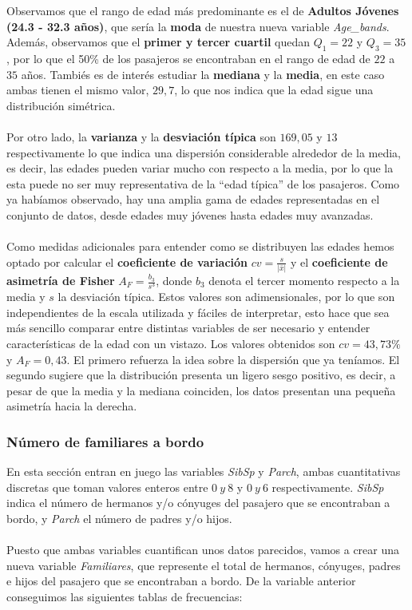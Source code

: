 \documentclass{article}
\begin{document}
\newpage
\noindent Observamos que el rango de edad más predominante es el de \textbf{Adultos Jóvenes (24.3 - 32.3 años)}, que sería la \textbf{moda} de nuestra nueva variable \textit{Age\_bands}. Además, observamos que el \textbf{primer y tercer cuartil} quedan $Q_{1}=22$ y $Q_{3}=35$, por lo que el 50\% de los pasajeros se encontraban en el rango de edad de $22$ a $35$ años. Tambiés es de interés estudiar la \textbf{mediana} y la \textbf{media}, en este caso ambas tienen el mismo valor, $29,7$, lo que nos indica que la edad sigue una distribución simétrica.\\\\
Por otro lado, la \textbf{varianza} y la \textbf{desviación típica} son $169,05$ y $13$ respectivamente lo que indica una dispersión considerable alrededor de la media, es decir, las edades pueden variar mucho con respecto a la media, por lo que la esta puede no ser muy representativa de la ``edad típica'' de los pasajeros. Como ya habíamos observado, hay una amplia gama de edades representadas en el conjunto de datos, desde edades muy jóvenes hasta edades muy avanzadas.\\\\
Como medidas adicionales para entender como se distribuyen las edades hemos optado por calcular el \textbf{coeficiente de variación} $cv=\frac{s}{|\bar{x}|}$ y 
el \textbf{coeficiente de asimetría de Fisher} $A_{F}=\frac{b_{3}}{s^{3}}$, donde $b_{3}$ denota el tercer momento respecto a la media y $s$ la desviación típica. Estos valores son adimensionales, por lo que son independientes de la escala utilizada y fáciles de interpretar, esto hace que sea más sencillo comparar entre distintas variables de ser necesario y entender características de la edad con un vistazo. Los valores obtenidos son $cv=43,73\%$ y $A_{F}=0,43$. El primero refuerza la idea sobre la dispersión que ya teníamos. El segundo sugiere que la distribución presenta un ligero sesgo positivo, es decir, a pesar de que la media y la mediana coinciden, los datos presentan una pequeña asimetría hacia la derecha.


\newpage
\subsubsection{Número de familiares a bordo}
En esta sección entran en juego las variables \textit{SibSp} y \textit{Parch}, ambas cuantitativas discretas que toman valores enteros entre $0\ y\ 8$ y $0\ y\ 6$ respectivamente. \textit{SibSp} indica el número de hermanos y/o cónyuges del pasajero que se encontraban a bordo, y \textit{Parch} el número de padres y/o hijos.\\\\
Puesto que ambas variables cuantifican unos datos parecidos, vamos a crear una nueva variable \textit{Familiares}, que represente el total de hermanos, cónyuges, padres e hijos del pasajero que se encontraban a bordo. De la variable anterior conseguimos las siguientes tablas de frecuencias:
\end{document}
